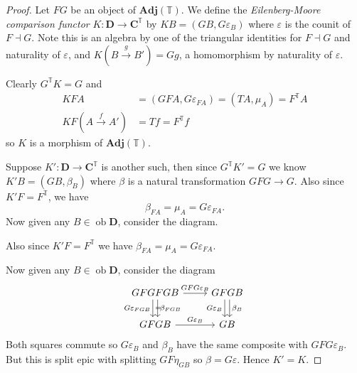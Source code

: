 \documentclass[a4paper]{article}
\renewcommand{\c}[1]{\mathbf{#1}}
\DeclareMathOperator{\ob}{ob}
\newcommand{\adjoint}{\dashv}
\newcommand{\T}{{\mathbb{T}}} %
\begin{document}
\begin{proof}
  Let \(F G\) be an object of \(\c{Adj} (\T)\). We define the \emph{Eilenberg-Moore comparison functor} \(K: \c D \to \c C^\T\) by \(KB = (GB, G\varepsilon_B)\) where \(\varepsilon\) is the counit of \(F \adjoint G\). Note this is an algebra by one of the triangular identities for \(F \adjoint G\) and naturality of \(\varepsilon\), and \(K(B \xrightarrow{g} B') = Gg\), a homomorphism by naturality of \(\varepsilon\).

  Clearly \(G^\T K = G\) and
  \begin{align*}
    KFA &= (GFA, G\varepsilon_{FA}) = (TA, \mu_A) = F^\T A \\
    KF(A \xrightarrow{f} A') &= Tf = F^\T f
  \end{align*}
  so \(K\) is a morphism of \(\c{Adj} (\T)\).

  Suppose \(K': \c D \to \c C^\T\) is another such, then since \(G^\T K' = G\) we know \(K'B = (GB, \beta_B)\) where \(\beta\) is a natural transformation \(GFG \to G\). Also since \(K' F = F^\T\), we have
  \[
    \beta_{FA} = \mu_A = G\varepsilon_{FA}.
  \]
  Now given any \(B \in \ob \c D\), consider the diagram.

  Also since \(K'F = F^\T\) we have \(\beta_{FA} = \mu_A = G \varepsilon_{FA}\).

  Now given any \(B \in \ob \c D\), consider the diagram
  \[
    \begin{tikzcd}
      GFGFGB \ar[r, "GFG\varepsilon_B"] \ar[d, shift right, "G\varepsilon_{FGB}"', "="] \ar[d, shift left, "\beta_{FGB}"] & GFGB \ar[d, shift right, "G\varepsilon_B"'] \ar[d, shift left, "\beta_B"] \\
      GFGB \ar[r, "G\varepsilon_B"] & GB
    \end{tikzcd}
  \]
  Both squares commute so \(G\varepsilon_B\) and \(\beta_B\) have the same composite with \(GFG\varepsilon_B\). But this is split epic with splitting \(GF\eta_{GB}\) so \(\beta = G\varepsilon\). Hence \(K' = K\).


\end{proof}
\end{document}
